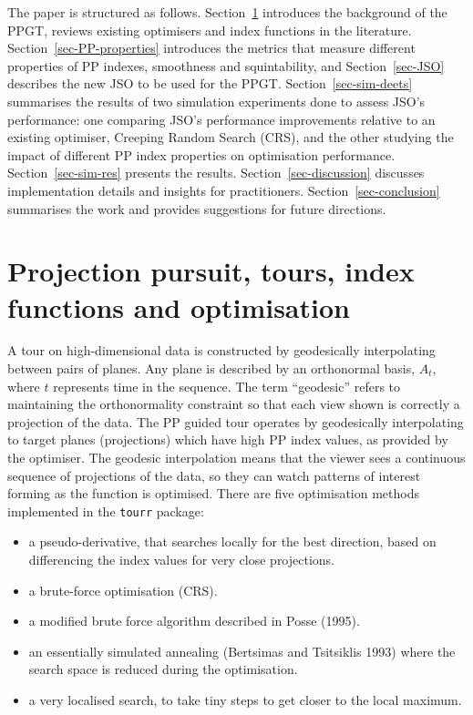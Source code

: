 \documentclass[
  12pt,
]{interact}
\providecommand{\tightlist}{%
  \setlength{\itemsep}{0pt}\setlength{\parskip}{0pt}}\usepackage{longtable,booktabs,array}
\theoremstyle{plain}
\begin{document}
The paper is structured as follows. Section~\ref{sec-background}
introduces the background of the PPGT, reviews existing optimisers and
index functions in the literature. Section~\ref{sec-PP-properties}
introduces the metrics that measure different properties of PP indexes,
smoothness and squintability, and Section~\ref{sec-JSO} describes the
new JSO to be used for the PPGT. Section~\ref{sec-sim-deets} summarises
the results of two simulation experiments done to assess JSO's
performance: one comparing JSO's performance improvements relative to an
existing optimiser, Creeping Random Search (CRS), and the other studying
the impact of different PP index properties on optimisation performance.
Section~\ref{sec-sim-res} presents the results.
Section~\ref{sec-discussion} discusses implementation details and
insights for practitioners. Section~\ref{sec-conclusion} summarises the
work and provides suggestions for future directions.

\hypertarget{sec-background}{%
\section{Projection pursuit, tours, index functions and
optimisation}\label{sec-background}}

A tour on high-dimensional data is constructed by geodesically
interpolating between pairs of planes. Any plane is described by an
orthonormal basis, \(A_t\), where \(t\) represents time in the sequence.
The term ``geodesic'' refers to maintaining the orthonormality
constraint so that each view shown is correctly a projection of the
data. The PP guided tour operates by geodesically interpolating to
target planes (projections) which have high PP index values, as provided
by the optimiser. The geodesic interpolation means that the viewer sees
a continuous sequence of projections of the data, so they can watch
patterns of interest forming as the function is optimised. There are
five optimisation methods implemented in the \texttt{tourr} package:

\begin{itemize}
\tightlist
\item
  a pseudo-derivative, that searches locally for the best direction,
  based on differencing the index values for very close projections.
\item
  a brute-force optimisation (CRS).
\item
  a modified brute force algorithm described in Posse (1995).
\item
  an essentially simulated annealing (Bertsimas and Tsitsiklis 1993)
  where the search space is reduced during the optimisation.
\item
  a very localised search, to take tiny steps to get closer to the local
  maximum.
\end{itemize}
\end{document}
